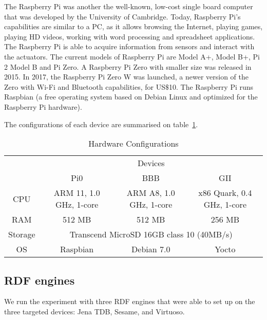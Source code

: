 The Raspberry Pi was another the well-known, low-cost single board computer that was developed by the University of Cambridge.
Today, Raspberry Pi’s capabilities are similar to a PC, as it allows browsing the Internet, playing games, playing HD videos, working with word processing and spreadsheet applications. 
The Raspberry Pi is able to acquire information from sensors and interact with the actuators. 
The current models of Raspberry Pi are Model A+, Model B+, Pi 2 Model B and Pi Zero.
A Raspberry Pi Zero with smaller size  was released in 2015.
In 2017, the Raspberry Pi Zero W was launched, a newer version of the Zero with Wi-Fi and Bluetooth capabilities, for US$\$$10.
The Raspberry Pi runs Raspbian (a free operating system based on Debian Linux and optimized for the Raspberry Pi hardware). 

The configurations of each device are summarised on table~\ref{t:hc}. 

\begin{table}[ht!]
\centering
\begin{tabular}{ c | p{3.5cm} | p{3.5cm} | p{3.5cm} |}
\cline{2-4}
& \multicolumn{3}{c|}{Devices} \\  
\cline{2-4}
                                    & \multicolumn{1}{c|}{Pi0} & \multicolumn{1}{c|}{BBB} & \multicolumn{1}{c|}{GII}\\ 
\hline
\multicolumn{1}{|c|}{CPU}          & \multicolumn{1}{c|}{ARM 11,    1.0 GHz, 1-core }
								   & \multicolumn{1}{c|}{ARM A8,    1.0 GHz, 1-core }
                                   & \multicolumn{1}{c|}{x86 Quark, 0.4 GHz, 1-core } \\
\hline
\multicolumn{1}{|c|}{RAM}          & \multicolumn{1}{c|}{512 MB} & \multicolumn{1}{c|}{512 MB} &\multicolumn{1}{c|}{256 MB} \\
\hline
\multicolumn{1}{|c|}{Storage}      & \multicolumn{3}{c|}{Transcend MicroSD 16GB class 10 (40MB/s)} \\
\hline
\multicolumn{1}{|c|}{OS}           & \multicolumn{1}{c|}{Raspbian} & \multicolumn{1}{c|}{Debian 7.0} & \multicolumn{1}{c|}{Yocto} \\
\hline
\end{tabular}
\caption{Hardware Configurations}
\label{t:hc}
\end{table}

\subsection{RDF engines}
We run the experiment with three RDF engines that were able to set up on the three targeted devices: Jena TDB, Sesame, and Virtuoso.

